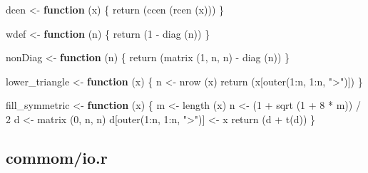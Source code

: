 \documentclass[
  12pt,
]{book}
\newenvironment{Shaded}{\begin{snugshade}}{\end{snugshade}}
\newcommand{\ControlFlowTok}[1]{\textcolor[rgb]{0.13,0.29,0.53}{\textbf{#1}}}
\newcommand{\DecValTok}[1]{\textcolor[rgb]{0.00,0.00,0.81}{#1}}
\newcommand{\FunctionTok}[1]{\textcolor[rgb]{0.00,0.00,0.00}{#1}}
\newcommand{\NormalTok}[1]{#1}
\newcommand{\OtherTok}[1]{\textcolor[rgb]{0.56,0.35,0.01}{#1}}
\newcommand{\SpecialCharTok}[1]{\textcolor[rgb]{0.00,0.00,0.00}{#1}}
\newcommand{\StringTok}[1]{\textcolor[rgb]{0.31,0.60,0.02}{#1}}
\theoremstyle{definition}
\theoremstyle{definition}
\theoremstyle{definition}
\theoremstyle{definition}
\theoremstyle{remark}
\begin{document}
\begin{Shaded}
\begin{Highlighting}[]
\NormalTok{dcen }\OtherTok{\textless{}{-}} \ControlFlowTok{function}\NormalTok{ (x) \{}
  \FunctionTok{return}\NormalTok{ (}\FunctionTok{ccen}\NormalTok{ (}\FunctionTok{rcen}\NormalTok{ (x)))}
\NormalTok{\}}


\NormalTok{wdef }\OtherTok{\textless{}{-}} \ControlFlowTok{function}\NormalTok{ (n) \{}
  \FunctionTok{return}\NormalTok{ (}\DecValTok{1} \SpecialCharTok{{-}} \FunctionTok{diag}\NormalTok{ (n))}
\NormalTok{\}}


\NormalTok{nonDiag }\OtherTok{\textless{}{-}} \ControlFlowTok{function}\NormalTok{ (n) \{}
  \FunctionTok{return}\NormalTok{ (}\FunctionTok{matrix}\NormalTok{ (}\DecValTok{1}\NormalTok{, n, n) }\SpecialCharTok{{-}} \FunctionTok{diag}\NormalTok{ (n))}
\NormalTok{\}}


\NormalTok{lower\_triangle }\OtherTok{\textless{}{-}} \ControlFlowTok{function}\NormalTok{ (x) \{}
\NormalTok{  n }\OtherTok{\textless{}{-}} \FunctionTok{nrow}\NormalTok{ (x)}
  \FunctionTok{return}\NormalTok{ (x[}\FunctionTok{outer}\NormalTok{(}\DecValTok{1}\SpecialCharTok{:}\NormalTok{n, }\DecValTok{1}\SpecialCharTok{:}\NormalTok{n, }\StringTok{"\textgreater{}"}\NormalTok{)])}
\NormalTok{\}}

\NormalTok{fill\_symmetric }\OtherTok{\textless{}{-}} \ControlFlowTok{function}\NormalTok{ (x) \{}
\NormalTok{  m }\OtherTok{\textless{}{-}} \FunctionTok{length}\NormalTok{ (x)}
\NormalTok{  n }\OtherTok{\textless{}{-}}\NormalTok{ (}\DecValTok{1} \SpecialCharTok{+} \FunctionTok{sqrt}\NormalTok{ (}\DecValTok{1} \SpecialCharTok{+} \DecValTok{8} \SpecialCharTok{*}\NormalTok{ m)) }\SpecialCharTok{/} \DecValTok{2}
\NormalTok{  d }\OtherTok{\textless{}{-}} \FunctionTok{matrix}\NormalTok{ (}\DecValTok{0}\NormalTok{, n, n)}
\NormalTok{  d[}\FunctionTok{outer}\NormalTok{(}\DecValTok{1}\SpecialCharTok{:}\NormalTok{n, }\DecValTok{1}\SpecialCharTok{:}\NormalTok{n, }\StringTok{"\textgreater{}"}\NormalTok{)] }\OtherTok{\textless{}{-}}\NormalTok{ x}
  \FunctionTok{return}\NormalTok{ (d }\SpecialCharTok{+} \FunctionTok{t}\NormalTok{(d))}
\NormalTok{\}}
\end{Highlighting}
\end{Shaded}

\hypertarget{apiocode}{%
\subsection{commom/io.r}\label{apiocode}}
\end{document}
